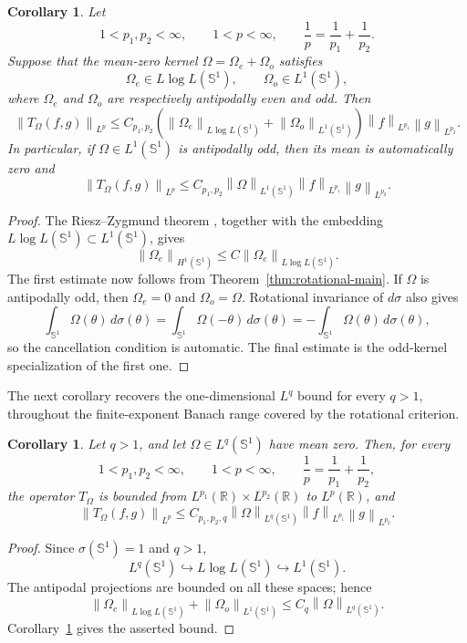 \documentclass[11pt]{amsart}
\newtheorem{corollary}[definition]{Corollary}
\theoremstyle{remark}
\numberwithin{equation}{section}
\newcommand{\R}{\mathbb R}
\newcommand{\Sph}{\mathbb S^1}
\newcommand{\norm}[1]{\left\lVert #1\right\rVert}
\begin{document}
	\begin{corollary}
		\label{cor:parity-endpoint}
		Let
		\[
		1<p_1,p_2<\infty,
		\qquad
		1<p<\infty,
		\qquad
		\frac1p=\frac1{p_1}+\frac1{p_2}.
		\]
		Suppose that the mean-zero kernel
		\(\Omega=\Omega_e+\Omega_o\) satisfies
		\[
		\Omega_e\in L\log L(\Sph),
		\qquad
		\Omega_o\in L^1(\Sph),
		\]
		where \(\Omega_e\) and \(\Omega_o\) are respectively antipodally even
		and odd. Then
		\[
		\norm{T_\Omega(f,g)}_{L^p}
		\le
		C_{p_1,p_2}
		\left(
		\norm{\Omega_e}_{L\log L(\Sph)}
		+
		\norm{\Omega_o}_{L^1(\Sph)}
		\right)
		\norm f_{L^{p_1}}\norm g_{L^{p_2}}.
		\]
		In particular, if \(\Omega\in L^1(\Sph)\) is antipodally odd, then its
		mean is automatically zero and
		\[
		\norm{T_\Omega(f,g)}_{L^p}
		\le
		C_{p_1,p_2}
		\norm{\Omega}_{L^1(\Sph)}
		\norm f_{L^{p_1}}\norm g_{L^{p_2}}.
		\]
	\end{corollary}
	
	\begin{proof}
		The Riesz--Zygmund theorem
		\cite[Chapter~VII]{Zygmund1959}, together with the embedding
		\(L\log L(\Sph)\subset L^1(\Sph)\), gives
		\[
		\norm{\Omega_e}_{H^1(\Sph)}
		\le
		C\norm{\Omega_e}_{L\log L(\Sph)}.
		\]
		The first estimate now follows from
		Theorem~\ref{thm:rotational-main}. If \(\Omega\) is antipodally odd, then
		\(\Omega_e=0\) and \(\Omega_o=\Omega\). Rotational invariance of
		\(d\sigma\) also gives
		\[
		\int_{\Sph}\Omega(\theta)\,d\sigma(\theta)
		=
		\int_{\Sph}\Omega(-\theta)\,d\sigma(\theta)
		=
		-\int_{\Sph}\Omega(\theta)\,d\sigma(\theta),
		\]
		so the cancellation condition is automatic. The final estimate is the
		odd-kernel specialization of the first one.
	\end{proof}
	
	The next corollary recovers the one-dimensional \(L^q\) bound for every
	\(q>1\), throughout the finite-exponent Banach range covered by the
	rotational criterion.
	
	\begin{corollary}
		\label{cor:Lq-one-dimensional}
		Let \(q>1\), and let \(\Omega\in L^q(\Sph)\) have mean zero. Then, for
		every
		\[
		1<p_1,p_2<\infty,
		\qquad
		1<p<\infty,
		\qquad
		\frac1p=\frac1{p_1}+\frac1{p_2},
		\]
		the operator \(T_\Omega\) is bounded from
		\(L^{p_1}(\R)\times L^{p_2}(\R)\) to \(L^p(\R)\), and
		\[
		\norm{T_\Omega(f,g)}_{L^p}
		\le
		C_{p_1,p_2,q}
		\norm{\Omega}_{L^q(\Sph)}
		\norm f_{L^{p_1}}\norm g_{L^{p_2}}.
		\]
	\end{corollary}
	
	\begin{proof}
		Since \(\sigma(\Sph)=1\) and \(q>1\),
		\[
		L^q(\Sph)\hookrightarrow L\log L(\Sph)
		\hookrightarrow L^1(\Sph).
		\]
		The antipodal projections are bounded on all these spaces; hence
		\[
		\norm{\Omega_e}_{L\log L(\Sph)}
		+
		\norm{\Omega_o}_{L^1(\Sph)}
		\le
		C_q\norm{\Omega}_{L^q(\Sph)}.
		\]
		Corollary~\ref{cor:parity-endpoint} gives the asserted bound.
	\end{proof}
	
\end{document}
